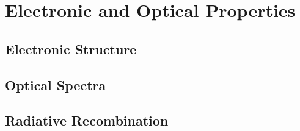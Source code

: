 \section{Electronic and Optical Properties}

\subsection{Electronic Structure}

\subsection{Optical Spectra}

\subsection{Radiative Recombination}
